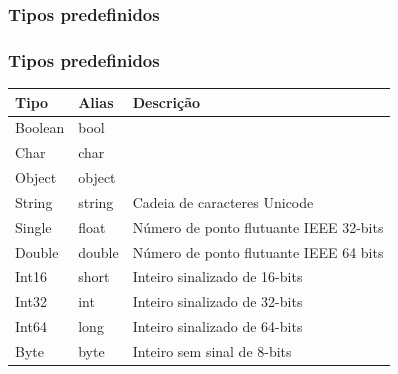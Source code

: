 \documentclass{beamer}
\begin{document}
\subsubsection{Tipos predefinidos}
\begin{frame}
\frametitle{Tipos predefinidos}
\begin{table}[]
	\centering
	\label{my-label}
	\begin{tabular}{|l|l|l|}
		\hline
		\textbf{Tipo}~\footnotemark & \textbf{Alias}\footnotemark  & \textbf{Descrição}                     \\ \hline
		Boolean         & bool              &                                        \\ \hline
		Char            & char              &                                        \\ \hline
		Object          & object            &                                        \\ \hline
		String          & string            & Cadeia de caracteres Unicode           \\ \hline
		Single          & float             & Número de ponto flutuante IEEE 32-bits \\ \hline
		Double          & double            & Número de ponto flutuante IEEE 64 bits \\ \hline
		Int16           & short             & Inteiro sinalizado de 16-bits          \\ \hline
		Int32           & int               & Inteiro sinalizado de 32-bits          \\ \hline
		Int64           & long              & Inteiro sinalizado de 64-bits          \\ \hline
		Byte            & byte              & Inteiro sem sinal de 8-bits            \\ \hline
	\end{tabular}
\end{table}
\end{frame}
\end{document}

